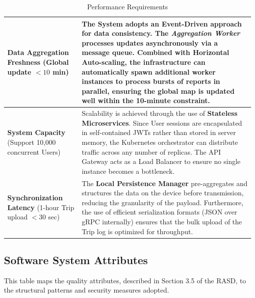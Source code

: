 \begin{table}[H]
\begin{xltabular}{\textwidth}{|p{0.25\textwidth}|X|}
    \textbf{Data Aggregation Freshness} \newline
    (Global update $< 10$ min) & 
    The System adopts an \textbf{Event-Driven} approach for data consistency. The \emph{Aggregation Worker} processes updates asynchronously via a message queue. Combined with \textbf{Horizontal Auto-scaling}, the infrastructure can automatically spawn additional worker instances to process bursts of reports in parallel, ensuring the global map is updated well within the 10-minute constraint. \\
    \hline
    
    \textbf{System Capacity} \newline
    (Support 10,000 concurrent Users) & 
    Scalability is achieved through the use of \textbf{Stateless Microservices}. Since User sessions are encapsulated in self-contained JWTs rather than stored in server memory, the Kubernetes orchestrator can distribute traffic across any number of replicas. The API Gateway acts as a Load Balancer to ensure no single instance becomes a bottleneck. \\
    \hline
    
    \textbf{Synchronization Latency} \newline
    (1-hour Trip upload $< 30$ sec) & 
    The \textbf{Local Persistence Manager} pre-aggregates and structures the data on the device before transmission, reducing the granularity of the payload. Furthermore, the use of efficient serialization formats (JSON over gRPC internally) ensures that the bulk upload of the Trip log is optimized for throughput. \\
    \hline
\end{xltabular}
\caption{Performance Requirements}
\end{table}

\subsection{Software System Attributes}
This table maps the quality attributes, described in Section 3.5 of the RASD, to the structural patterns and security measures adopted.

